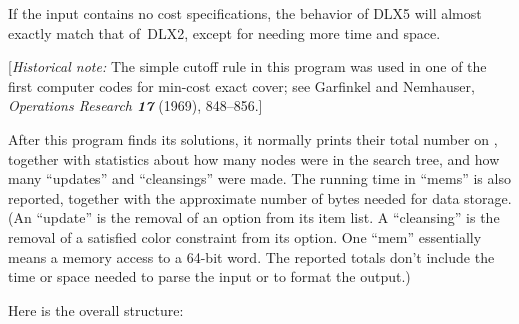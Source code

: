 If the input contains no cost specifications, the behavior of {\mc DLX5}
will almost exactly match that of~{\mc DLX2}, except for needing
more time and space.

[{\it Historical note:\/} The simple cutoff rule in this program was
used in one of the first computer codes for min-cost exact cover;
see Garfinkel and Nemhauser, {\sl Operations Research\/ \bf17} (1969),
848--856.]

\fi

After this program finds its solutions, it normally prints their total
number on , together with statistics about how many
nodes were in the search tree, and how many ``updates'' and
``cleansings'' were made.
The running time in ``mems'' is also reported, together with the approximate
number of bytes needed for data storage.
(An ``update'' is the removal of an option from its item list.
A ``cleansing'' is the removal of a satisfied color constraint from its option.
One ``mem'' essentially means a memory access to a 64-bit word.
The reported totals don't include the time or space needed to parse the
input or to format the output.)

Here is the overall structure:

